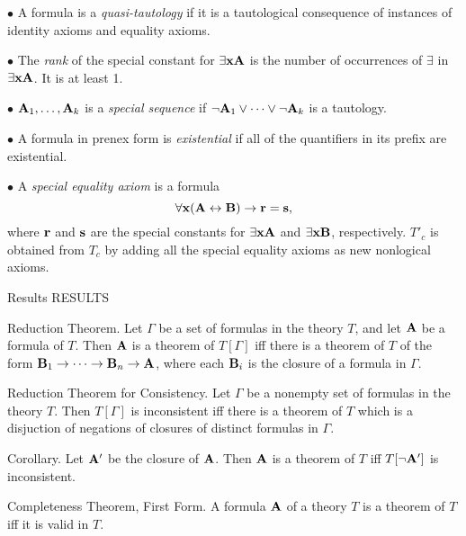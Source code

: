 \item{$\bullet$} A formula is a {\it quasi-tautology} if it is a tautological
consequence of instances of identity axioms and equality axioms.

\item{$\bullet$} The {\it rank} of the special constant for $\exists{\bf x}{\bf A}$ is the
number of occurrences of $\exists$ in $\exists{\bf x}{\bf A}$. It is at least 1.

\item{$\bullet$} ${\bf A}_1,\dots,{\bf A}_k$ is a {\it special sequence} if 
$\neg{\bf A}_1 \lor \cdots \lor \neg{\bf A}_k$ is a tautology.

\item{$\bullet$} A formula in prenex form is {\it existential} if all of the quantifiers
in its prefix are existential.

\item{$\bullet$} A {\it special equality axiom} is a formula
$$
\forall{\bf x} ({\bf A} \leftrightarrow {\bf B}) \to {\bf r} = {\bf s},
$$
where ${\bf r}$ and ${\bf s}$ are the special constants for $\exists{\bf x}{\bf A}$ and $\exists{\bf x}{\bf B}$,
respectively. $T'_c$ is obtained from $T_c$ by adding all the special equality
axioms as new nonlogical axioms.

 {Results}
\beginsection RESULTS


\proclaim Reduction Theorem. Let $\Gamma$ be a set of formulas in the theory $T$, and
let ${\bf A}$ be a formula of $T$. Then ${\bf A}$ is a theorem of $T[\Gamma]$ iff there is a
theorem of $T$ of the form ${\bf B}_1 \to \cdots \to {\bf B}_n \to {\bf A}$, where each ${\bf B}_i$ is
the closure of a formula in $\Gamma$.

\proclaim Reduction Theorem for Consistency. Let $\Gamma$ be a nonempty set of
formulas in the theory $T$. Then $T[\Gamma]$ is inconsistent iff there is a theorem
of $T$ which is a disjuction of negations of closures of distinct formulas in $\Gamma$.

\proclaim Corollary. Let ${\bf A}'$ be the closure of ${\bf A}$. Then ${\bf A}$ is a theorem of $T$
iff $T[\neg {\bf A}']$ is inconsistent.


\proclaim Completeness Theorem, First Form. A formula ${\bf A}$ of a theory $T$ is a theorem
of $T$ iff it is valid in $T$.

